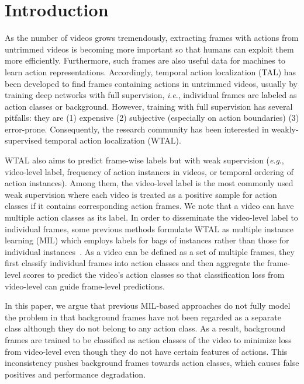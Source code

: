 \documentclass[letterpaper]{article} %
\newcommand{\ie}{\textit{i}.\textit{e}.}
\newcommand{\eg}{\textit{e}.\textit{g}.}
\begin{document}
\section{Introduction}
\label{sec:intro}

As the number of videos grows tremendously, extracting frames with actions from untrimmed videos is becoming more important so that humans can exploit them more efficiently. Furthermore, such frames are also useful data for machines to learn action representations. Accordingly, temporal action localization (TAL) has been developed to find frames containing actions in untrimmed videos, usually by training deep networks with full supervision, \ie, individual frames are labeled as action classes or background. However, training with full supervision has several pitfalls: they are (1) expensive (2) subjective (especially on action boundaries) (3) error-prone. Consequently, the research community has been interested in weakly-supervised temporal action localization (WTAL).

WTAL also aims to predict frame-wise labels but with weak supervision (\eg, video-level label, frequency of action instances in videos, or temporal ordering of action instances). Among them, the video-level label is the most commonly used weak supervision where each video is treated as a positive sample for action classes if it contains corresponding action frames. We note that a video can have multiple action classes as its label.
In order to disseminate the video-level label to individual frames, some previous methods formulate WTAL as multiple instance learning (MIL) which employs labels for bags of instances rather than those for individual instances~\cite{wang2017untrimmednets,paul2018w,Xu2019SegregatedTA}. As a video can be defined as a set of multiple frames, they first classify individual frames into action classes and then aggregate the frame-level scores to predict the video's action classes so that classification loss from video-level can guide frame-level predictions.

In this paper, we argue that previous MIL-based approaches do not fully model the problem in that background frames have not been regarded as a separate class although they do not belong to any action class. As a result, background frames are trained to be classified as action classes of the video to minimize loss from video-level even though they do not have certain features of actions. This inconsistency pushes background frames towards action classes, which causes false positives and performance degradation.
\end{document}
